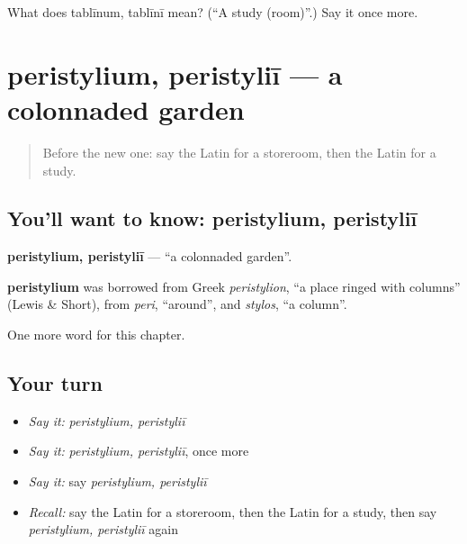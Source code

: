 \begin{tcolorbox}[breakable,colback=teal!4,colframe=teal!35!black,title={Before you move on}]
What does tablīnum, tablīnī mean? (\textquotedblleft{}A study (room)\textquotedblright{}.) Say it once more.
\end{tcolorbox}
\section[peristylium, peristyliī]{peristylium, peristyliī — a colonnaded garden}

\label{lesson:LA-C185-peristylium}



\begin{quote}
Before the new one: say the Latin for a storeroom, then the Latin for a study.
\end{quote}

\subsection*{You'll want to know: peristylium, peristyliī}
\textbf{peristylium, peristyliī} — \textquotedblleft{}a colonnaded garden\textquotedblright{}.

\begin{cousinweb}
\textbf{peristylium} was borrowed from Greek \emph{peristylion}, \textquotedblleft{}a place ringed with columns\textquotedblright{} (Lewis \& Short), from \emph{peri}, \textquotedblleft{}around\textquotedblright{}, and \emph{stylos}, \textquotedblleft{}a column\textquotedblright{}.
\end{cousinweb}

\begin{grammarlens}[title={What you've built}]
One more word for this chapter.
\end{grammarlens}

\subsection*{Your turn}
\begin{itemize}
\raggedright
  \item \emph{Say it:} \emph{peristylium, peristyliī}
  \item \emph{Say it:} \emph{peristylium, peristyliī}, once more
  \item \emph{Say it:} say \emph{peristylium, peristyliī}
  \item \emph{Recall:} say the Latin for a storeroom, then the Latin for a study, then say \emph{peristylium, peristyliī} again
\end{itemize}

